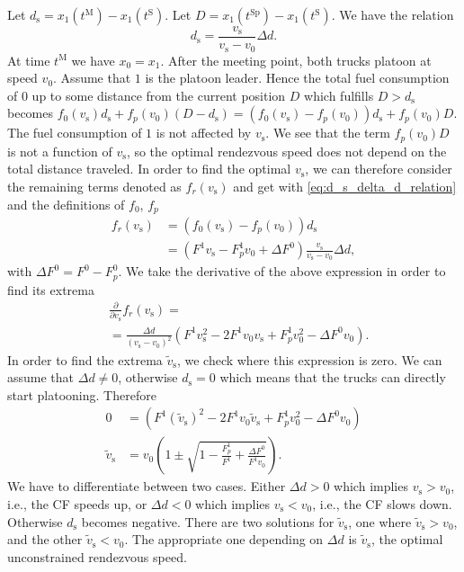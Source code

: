 \documentclass[letterpaper,10pt,conference,twocolumn]{IEEEtran}
\newcommand{\op}[1]{\mathrm{#1}}
\theoremstyle{definition}
\begin{document}
Let $d_\op{s} = x_1(t^\op{M}) - x_1(t^\op{S})$. Let $D = x_1(t^\op{Sp}) - x_1(t^\op{S})$. 
We have the relation
\begin{equation}
  d_\op{s} = \frac{v_\op{s}}{v_\op{s} - v_0} \Delta d. \label{eq:d_s_delta_d_relation}
\end{equation}
At time $t^\op{M}$ we have $x_0 = x_1$. After the meeting point, both trucks platoon at speed $v_0$. Assume that $1$ is the platoon leader. Hence the total fuel consumption of $0$ up to some distance from the current position $D$ which fulfills $D > d_\op{s}$ becomes
$
 f_0(v_\op{s})d_\op{s} + f_p(v_0)(D - d_\op{s})
 = (f_0(v_\op{s}) - f_p(v_0))d_\op{s} + f_p(v_0)D.
$
The fuel consumption of $1$ is not affected by $v_\op{s}$. We see that the term $f_p(v_0)D$ is not a function of $v_\op{s}$, so the optimal rendezvous speed does not depend on the total distance traveled. In order to find the optimal $v_\op{s}$, we can therefore consider the remaining terms denoted as $f_r(v_\op{s})$ and get with \eqref{eq:d_s_delta_d_relation} and the definitions of $f_0$, $f_p$
\begin{align*}
 f_r(v_\op{s}) &= (f_0(v_\op{s}) - f_p(v_0))d_\op{s}\\
 &= (F^1 v_\op{s} - F_p^1 v_0 + \Delta F^0) \frac{v_\op{s}}{v_\op{s} - v_0}\Delta d,
\end{align*}
with $\Delta F^0 = F^0 - F_p^0$. We take the derivative of the above expression in order to find its extrema
\begin{align*}
 &\frac{\partial}{\partial v_\op{s}} f_r(v_\op{s}) = \\
 &= \frac{\Delta d}{(v_\op{s} - v_0)^2} (F^1 v_\op{s}^2 - 2F^1 v_0 v_\op{s} + F_p^1 v_0^2- \Delta F^0 v_0).
\end{align*}
In order to find the extrema $\tilde{v}_\op{s}$, we check where this expression is zero. We can assume that $\Delta d \neq 0$, otherwise $d_\op{s} = 0$ which means that the trucks can directly start platooning. Therefore 
\begin{align}
 0 &= (F^1 (\tilde{v}_\op{s})^2 - 2F^1 v_0 \tilde{v}_\op{s} + F_p^1 v_0^2- \Delta F^0 v_0) \label{eq:optimal_vs_cond}\\
 \tilde{v}_\op{s} &= v_0\left(1 \pm \sqrt{1 - \frac{F_p^1}{F^1} + \frac{\Delta F^0}{F^1 v_0}}\right).\label{eq:v_star_def}
\end{align}
We have to differentiate between two cases. Either $\Delta d > 0$ which implies $v_\op{s} > v_0$, i.e., the CF speeds up, or $\Delta d < 0$ which implies $v_\op{s} < v_0$, i.e., the CF slows down. Otherwise $d_\op{s}$ becomes negative. There are two solutions for $\tilde{v}_\op{s}$, one where $\tilde{v}_\op{s} > v_0$, and the other $\tilde{v}_\op{s} < v_0$. The appropriate one depending on $\Delta d$ is $\tilde{v}_\op{s}$, the optimal unconstrained rendezvous speed.
\end{document}

